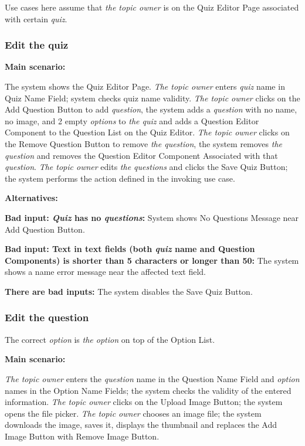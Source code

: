\documentclass[
    english, %
]{VUMIFPSkursinis}
\begin{document}
Use cases here assume that \textit{the topic owner} is on the Quiz Editor Page associated with certain \textit{quiz}.

\subsubsection{Edit the quiz}

\noindent\textbf{\fontsize{13}{15}\selectfont Main scenario:}

The system shows the Quiz Editor Page. \textit{The topic owner} enters \textit{quiz} name in Quiz Name Field; system checks quiz name validity. \textit{The topic owner} clicks on the Add Question Button to add \textit{question}, the system adds a \textit{question} with no name, no image, and 2 empty \textit{options} to \textit{the quiz} and adds a Question Editor Component to the Question List on the Quiz Editor. \textit{The topic owner} clicks on the Remove Question Button to remove \textit{the question}, the system removes \textit{the question} and removes the Question Editor Component Associated with that \textit{question}. \textit{The topic owner} edits \textit{the questions} and clicks the Save Quiz Button; the system performs the action defined in the invoking use case.

\noindent\textbf{\fontsize{13}{15}\selectfont Alternatives:}

\textbf{Bad input: \textit{Quiz} has no \textit{questions}:} System shows No Questions Message near Add Question Button.

\textbf{Bad input: Text in text fields (both \textit{quiz} name and Question Components) is shorter than 5 characters or longer than 50:} The system shows a name error message near the affected text field.

\textbf{There are bad inputs:} The system disables the Save Quiz Button.

\subsubsection{Edit the question}

The correct \textit{option} is \textit{the option} on top of the Option List.

\noindent\textbf{\fontsize{13}{15}\selectfont Main scenario:}

\textit{The topic owner} enters the \textit{question} name in the Question Name Field and \textit{option} names in the Option Name Fields; the system checks the validity of the entered information. \textit{The topic owner} clicks on the Upload Image Button; the system opens the file picker. \textit{The topic owner} chooses an image file; the system downloads the image, saves it, displays the thumbnail and replaces the Add Image Button with Remove Image Button.
\end{document}
